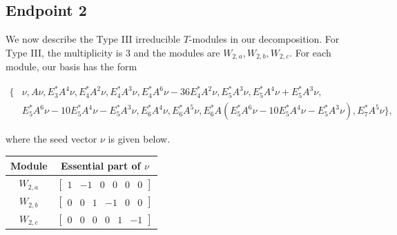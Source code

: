 \documentclass[12pt,letterpaper]{article}
\newcommand{\rowvector}[1]{\begin{bmatrix} #1 \end{bmatrix}}
\begin{document}
\subsection{Endpoint 2}

We now describe the Type III irreducible $T$-modules in our decomposition. For Type III, the multiplicity is 3 and the modules are $W_{2,a},W_{2,b},W_{2,c}$. For each module, our basis has the form 

\vspace{-0.6cm}
\begin{align*}
    \{&\nu, A\nu, E_3^*A^4\nu, E_4^*A^2\nu, E_4^*A^3\nu,
    E_4^*A^6\nu - 36E_4^*A^2\nu, E_5^*A^3\nu, E_5^*A^4\nu + E_5^*A^3\nu, \\ 
    &E_5^*A^6\nu - 10E_5^*A^4\nu-E_5^*A^3\nu, E_6^*A^4\nu, E_6^*A^5\nu,
    E_6^*A(E_5^*A^6\nu - 10E_5^*A^4\nu-E_5^*A^3\nu), E_7^*A^5\nu\},
\end{align*} 

where the seed vector $\nu$ is given below.
\begin{center}
    \begin{tabular}{c | c}
    \toprule
       \textbf{Module}  & \textbf {Essential part of }$\nu$ \\
       \midrule
       $W_{2,a}$  & $\rowvector{1 & -1 & 0 & 0 & 0 & 0}$ \\[1.67pt]
       $W_{2,b}$  & $\rowvector{0 & 0 & 1 & -1 & 0 & 0}$ \\[1.67pt]
       $W_{2,c}$  & $\rowvector{0 & 0 & 0 & 0 & 1 & -1}$ \\
    \bottomrule
   \end{tabular}
\end{center}
\end{document}
